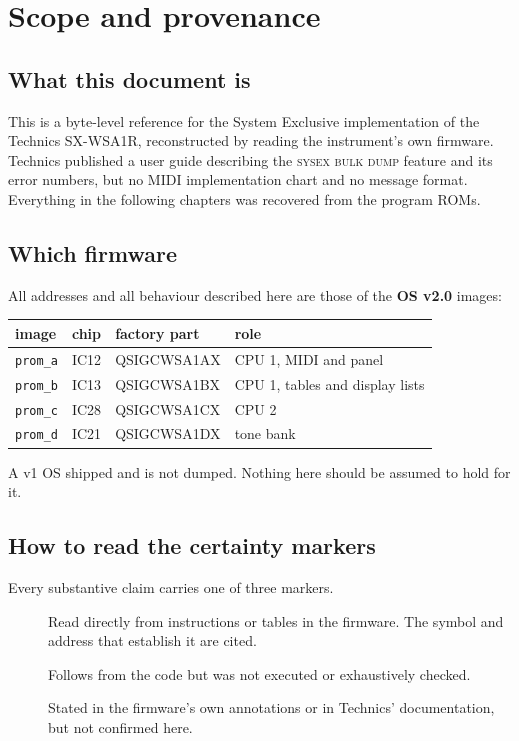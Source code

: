 \chapter{Scope and provenance}

\section{What this document is}
This is a byte-level reference for the System Exclusive implementation of the Technics
SX-WSA1R, reconstructed by reading the instrument's own firmware. Technics published a
user guide describing the \textsc{sysex bulk dump} feature and its error numbers, but no
MIDI implementation chart and no message format. Everything in the following chapters was
recovered from the program ROMs.

\section{Which firmware}
All addresses and all behaviour described here are those of the \textbf{OS v2.0} images:

\begin{center}
\begin{tabular}{llll}
\toprule
image & chip & factory part & role \\
\midrule
\texttt{prom\_a} & IC12 & QSIGCWSA1AX & CPU 1, MIDI and panel \\
\texttt{prom\_b} & IC13 & QSIGCWSA1BX & CPU 1, tables and display lists \\
\texttt{prom\_c} & IC28 & QSIGCWSA1CX & CPU 2 \\
\texttt{prom\_d} & IC21 & QSIGCWSA1DX & tone bank \\
\bottomrule
\end{tabular}
\end{center}

A v1 OS shipped and is not dumped. Nothing here should be assumed to hold for it.

\section{How to read the certainty markers}
Every substantive claim carries one of three markers.

\begin{description}
\item[\estab] Read directly from instructions or tables in the firmware. The symbol and
  address that establish it are cited.
\item[\likely] Follows from the code but was not executed or exhaustively checked.
\item[\unver] Stated in the firmware's own annotations or in Technics' documentation, but
  not confirmed here.
\end{description}

